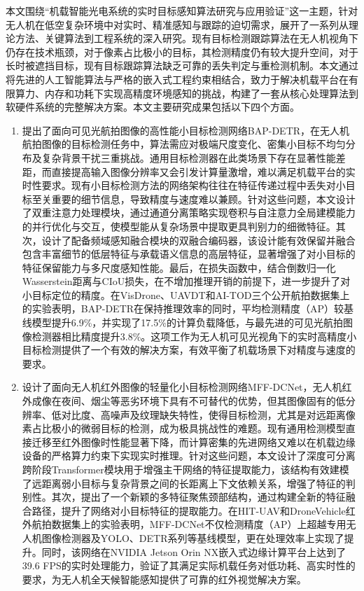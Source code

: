 

本文围绕“机载智能光电系统的实时目标感知算法研究与应用验证”这一主题，针对无人机在低空复杂环境中对实时、精准感知与跟踪的迫切需求，展开了一系列从理论方法、关键算法到工程系统的深入研究。现有目标检测跟踪算法在无人机视角下仍存在技术瓶颈，对于像素占比极小的目标，其检测精度仍有较大提升空间，对于长时被遮挡目标，现有目标跟踪算法缺乏可靠的丢失判定与重检测机制。本文通过将先进的人工智能算法与严格的嵌入式工程约束相结合，致力于解决机载平台在有限算力、内存和功耗下实现高精度环境感知的挑战，构建了一套从核心处理算法到软硬件系统的完整解决方案。本文主要研究成果包括以下四个方面。
\begin{enumerate}
    \item[(1)] 提出了面向可见光航拍图像的高性能小目标检测网络BAP-DETR，在无人机航拍图像的目标检测任务中，算法需应对极端尺度变化、密集小目标不均匀分布及复杂背景干扰三重挑战。通用目标检测器在此类场景下存在显著性能差距，而直接提高输入图像分辨率又会引发计算量激增，难以满足机载平台的实时性要求。现有小目标检测方法的网络架构往往在特征传递过程中丢失对小目标至关重要的细节信息，导致精度与速度难以兼顾。针对这些问题，本文设计了双重注意力处理模块，通过通道分离策略实现卷积与自注意力全局建模能力的并行优化与交互，使模型能从复杂场景中提取更具判别力的细微特征。其次，设计了配备频域感知融合模块的双融合编码器，该设计能有效保留并融合包含丰富细节的低层特征与承载语义信息的高层特征，显著增强了对小目标的特征保留能力与多尺度感知性能。最后，在损失函数中，结合倒数归一化Wasserstein距离与CIoU损失，在不增加推理开销的前提下，进一步提升了对小目标定位的精度。在VisDrone、UAVDT和AI-TOD三个公开航拍数据集上的实验表明，BAP-DETR在保持推理效率的同时，平均检测精度（AP）较基线模型提升6.9\%，并实现了17.5\%的计算负载降低，与最先进的可见光航拍图像检测器相比精度提升3.8\%。这项工作为无人机可见光视角下的实时高精度小目标检测提供了一个有效的解决方案，有效平衡了机载场景下对精度与速度的要求。

    \item[(2)] 设计了面向无人机红外图像的轻量化小目标检测网络MFF-DCNet，无人机红外成像在夜间、烟尘等恶劣环境下具有不可替代的优势，但其图像固有的低分辨率、低对比度、高噪声及纹理缺失特性，使得目标检测，尤其是对远距离像素占比极小的微弱目标的检测，成为极具挑战性的难题。现有通用检测模型直接迁移至红外图像时性能显著下降，而计算密集的先进网络又难以在机载边缘设备的严格算力约束下实现实时推理。针对这些问题，本文设计了深度可分离跨阶段Transformer模块用于增强主干网络的特征提取能力，该结构有效建模了远距离弱小目标与复杂背景之间的长距离上下文依赖关系，增强了特征的判别性。其次，提出了一个新颖的多特征聚焦颈部结构，通过构建全新的特征融合路径，提升了网络对小目标特征的提取能力。在HIT-UAV和DroneVehicle红外航拍数据集上的实验表明，MFF-DCNet不仅检测精度（AP）上超越专用无人机图像检测器及YOLO、DETR系列等基线模型，更在处理效率上实现了提升。同时，该网络在NVIDIA Jetson Orin NX嵌入式边缘计算平台上达到了39.6 FPS的实时处理能力，验证了其满足实际机载任务对低功耗、高实时性的要求，为无人机全天候智能感知提供了可靠的红外视觉解决方案。


\end{enumerate}
